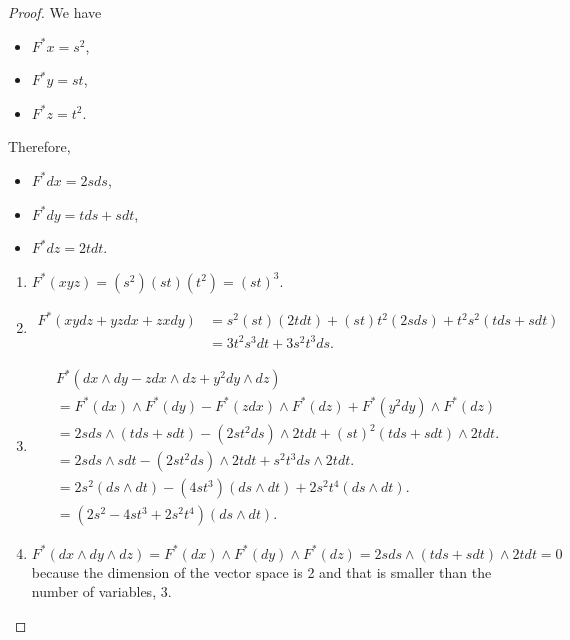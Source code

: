 \documentclass[12pt, psamsfonts]{amsart}
\theoremstyle{definition}
\theoremstyle{remark}
\numberwithin{equation}{section}
\begin{document}
\begin{proof}
  We have
  \begin{itemize}
    \item
      $F^*x = s^2$,
    \item
      $F^*y = st$,
    \item
      $F^*z = t^2$.
  \end{itemize}

  Therefore, 
  \begin{itemize}
    \item
      $F^*dx = 2sds$,
    \item
      $F^*dy = tds + sdt$,
    \item
      $F^*dz = 2tdt$.
  \end{itemize}

  \begin{enumerate}
    \item
      $F^*(xyz) = (s^2)(st)(t^2) = (st)^3$.
    \item
      \begin{align*}
        F^*(xydz + yzdx + zxdy)
          &= s^2(st)(2tdt) + (st)t^2(2sds) + t^2s^2(tds + sdt) \\
          &= 3t^2s^3dt + 3s^2t^3ds.
      \end{align*}
    \item
      \begin{align*}
        &F^*(dx \wedge dy - zdx \wedge dz + y^2dy \wedge dz) \\
          &= F^*(dx) \wedge F^*(dy) - F^*(zdx) \wedge F^*(dz) + F^*(y^2dy) \wedge F^*(dz) \\
          &= 2sds \wedge (tds + sdt) - (2st^2ds) \wedge 2tdt + (st)^2(tds + sdt) \wedge 2tdt. \\
          &= 2sds \wedge sdt - (2st^2ds) \wedge 2tdt + s^2t^3ds \wedge 2tdt. \\
          &= 2s^2(ds \wedge dt) - (4st^3)(ds \wedge dt) + 2s^2t^4(ds \wedge dt). \\
          &= (2s^2 - 4st^3 + 2s^2t^4)(ds \wedge dt).
      \end{align*}
    \item
      $F^*(dx \wedge dy \wedge dz) = F^*(dx) \wedge F^*(dy) \wedge F^*(dz) = 2sds \wedge (tds + sdt) \wedge 2tdt = 0$ because the dimension of the vector space is 2 and that is smaller than the number of variables, 3.
  \end{enumerate}
\end{proof}
\end{document}
